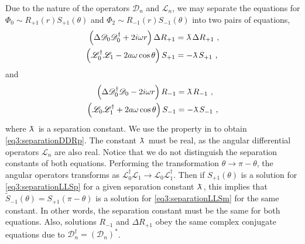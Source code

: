 Due to the nature of the operators $\mathscr{D}_n$ and $\mathscr{L}_n$, we may separate the equations for $\Phi_0 \sim R_{+1}(r) S_{+1}(\theta)$ and $\Phi_2 \sim R_{-1}(r) S_{-1}(\theta)$ into two pairs of equations, 
\begin{subequations}
    \label{eq3:separationRSp}
    \begin{align}
        \label{eq3:separationDDRp}
        \left(\Delta \mathscr{D}_0 \mathscr{D}^\dagger_0 + 2 i \omega r \right) \Delta R_{+1} 
        &= \lambdabar \Delta R_{+1} ~, \\
        \label{eq3:separationLLSp}
        \left( \mathscr{L}^\dagger_0 \mathscr{L}_1 - 2 a \omega \cos\theta \right) S_{+1}
        &= - \lambdabar S_{+1}  ~, 
    \end{align}
\end{subequations}
and
\begin{subequations}
    \label{eq3:separationRSm}
    \begin{align}
        \label{eq3:separationDDRm}
        \left( \Delta \mathscr{D}^\dagger_0 \mathscr{D}_0 - 2 i \omega r \right) R_{-1}
        &= \lambdabar R_{-1} ~, \\
        \label{eq3:separationLLSm}
        \left( \mathscr{L}_0 \mathscr{L}^\dagger_1 + 2 a \omega \cos\theta \right) S_{-1}
        &= - \lambdabar S_{-1}  ~,
    \end{align}
\end{subequations}
where $\lambdabar$ is a separation constant.
We use the property  in to obtain \eqref{eq3:separationDDRp}.
The constant $\lambdabar$ must be real, as the angular differential operators $\mathscr{L}_n$ are also real.
Notice that we do not distinguish the separation constants of both equations. Performing the transformation $\theta \rightarrow \pi-\theta$, the angular operators transforms as $\mathscr{L}^\dagger_0 \mathscr{L}_1 \rightarrow \mathscr{L}_0 \mathscr{L}^\dagger_1$. Then if $S_{+1}(\theta)$ is a solution for \eqref{eq3:separationLLSp} for a given separation constant $\lambdabar$, this implies that $\tilde{S}_{-1}(\theta)=S_{+1}(\pi-\theta)$ is a solution for \eqref{eq3:separationLLSm} for the same constant. 
In other words, the separation constant must be the same for both equations. 
Also, solutions $R_{-1}$ and $\Delta R_{+1}$ obey the same complex conjugate equations due to $\mathscr{D}^\dagger_n=(\mathscr{D}_n)^*$.

